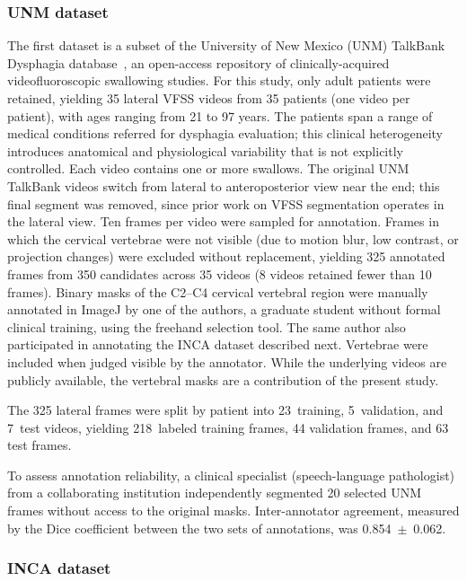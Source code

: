 \documentclass[a4paper,fleqn]{cas-dc}
\begin{document}
\subsubsection{UNM dataset}

The first dataset is a subset of the University of New Mexico (UNM) TalkBank Dysphagia database~\citep{ref_talkbank}, an open-access repository of clinically-acquired videofluoroscopic swallowing studies.
For this study, only adult patients were retained, yielding 35 lateral VFSS videos from 35 patients (one video per patient), with ages ranging from 21 to 97 years.
The patients span a range of medical conditions referred for dysphagia evaluation; this clinical heterogeneity introduces anatomical and physiological variability that is not explicitly controlled.
Each video contains one or more swallows.
The original UNM TalkBank videos switch from lateral to anteroposterior view near the end; this final segment was removed, since prior work on VFSS segmentation operates in the lateral view.
Ten frames per video were sampled for annotation. Frames in which the cervical vertebrae were not visible (due to motion blur, low contrast, or projection changes) were excluded without replacement, yielding 325 annotated frames from 350 candidates across 35 videos (8 videos retained fewer than 10 frames).
Binary masks of the C2--C4 cervical vertebral region were manually annotated in ImageJ by one of the authors, a graduate student without formal clinical training, using the freehand selection tool. The same author also participated in annotating the INCA dataset described next. Vertebrae were included when judged visible by the annotator.
While the underlying videos are publicly available, the vertebral masks are a contribution of the present study.

The 325 lateral frames were split by patient into 23~training, 5~validation, and 7~test videos, yielding 218~labeled training frames, 44 validation frames, and 63 test frames.

To assess annotation reliability, a clinical specialist (speech-language pathologist) from a collaborating institution independently segmented 20 selected UNM frames without access to the original masks.
Inter-annotator agreement, measured by the Dice coefficient between the two sets of annotations, was 0.854~$\pm$~0.062.

\subsubsection{INCA dataset}
\end{document}
